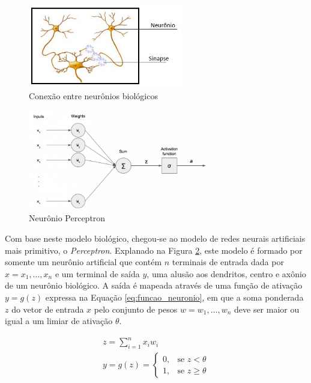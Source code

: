 \begin{figure}[ht]
	\centering
	\includegraphics[width=0.6\textwidth]{img/redeneuralbiologica.jpg}
	\caption{Conexão entre neurônios biológicos}
	\label{fig:redeneuralbiologica}
\end{figure}

\begin{figure}[ht]
	\centering
	\includegraphics[width=0.7\textwidth]{img/perceptron.png}
	\caption{Neurônio Perceptron}
	\label{fig:perceptron}
\end{figure}

Com base neste modelo biológico, chegou-se ao modelo de redes neurais artificiais mais primitivo, o \emph{Perceptron}. Explanado na Figura \ref{fig:perceptron}, este modelo é formado por somente um neurônio artificial que contém $n$ terminais de entrada dada por $ x = x_1, \ldots, x_n$ e um terminal de saída $y$, uma alusão aos dendritos, centro e axônio de um neurônio biológico. A saída é mapeada através de uma função de ativação $y = g(z)$ expressa na Equação \ref{eq:funcao_neuronio}, em que a soma ponderada $z$ do vetor de entrada $x$ pelo conjunto de pesos $w = w_1, \ldots, w_n$ deve ser maior ou igual a um limiar de ativação $\theta$.

\begin{gather}\label{eq:funcao_neuronio}
	z = \sum_{i=1}^n x_i w_i\\
	y = g(z) =
		\begin{cases}
			0, & \text{se } z < \theta\\
			1, & \text{se } z \geq \theta
		\end{cases}
\end{gather}


